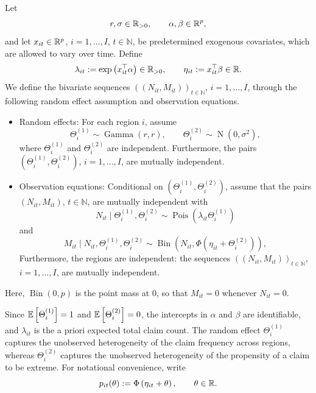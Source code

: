 \begin{model}
\label{model.thin}
Let
\[
r,\sigma\in\mathbb{R}_{>0},
\qquad
\alpha,\beta\in\mathbb{R}^p,
\]
and let \(x_{it}\in\mathbb{R}^p\), \(i=1,\ldots,I\), \(t\in\mathbb N\), be
predetermined exogenous covariates, which are allowed to vary over time.
Define
\[
\lambda_{it}:=\exp\left(x_{it}^\top\alpha\right)\in\mathbb{R}_{>0},
\qquad
\eta_{it}:=x_{it}^\top\beta\in\mathbb{R}.
\]
We define the bivariate sequences
\(\left((N_{it},M_{it})\right)_{t\in\mathbb N}\), \(i=1,\ldots,I\),
through the following random effect assumption and observation
equations.
\begin{itemize}
  \item[i.] Random effects: For each region \(i\), assume
  \[
  \Theta_i^{(1)}\sim\operatorname{Gamma}(r,r),
  \qquad
  \Theta_i^{(2)}\sim\operatorname{N}(0,\sigma^2),
  \]
  where \(\Theta_i^{(1)}\) and \(\Theta_i^{(2)}\) are independent.
  Furthermore, the pairs
  \(\left(\Theta_i^{(1)},\Theta_i^{(2)}\right)\), \(i=1,\ldots,I\),
  are mutually independent.

  \item[ii.] Observation equations: Conditional on
  \(\left(\Theta_i^{(1)},\Theta_i^{(2)}\right)\), assume that the pairs
  \((N_{it},M_{it})\), \(t\in\mathbb N\), are mutually independent with
  \[
  N_{it}\mid\Theta_i^{(1)},\Theta_i^{(2)}
  \sim
  \operatorname{Pois}\left(\lambda_{it}\Theta_i^{(1)}\right)
  \]
  and
  \[
  M_{it}\mid N_{it},\Theta_i^{(1)},\Theta_i^{(2)}
  \sim
  \operatorname{Bin}\left(N_{it},\Phi\left(\eta_{it}+\Theta_i^{(2)}\right)\right),
  \]
  Furthermore, the regions are independent: the sequences
  \(\left((N_{it},M_{it})\right)_{t\in\mathbb N}\), \(i=1,\ldots,I\),
  are mutually independent.
\end{itemize}
\end{model}
Here, \(\operatorname{Bin}(0,p)\) is the point mass at \(0\), so that
\(M_{it}=0\) whenever \(N_{it}=0\).

Since \({\mathbb E}\left[\Theta_i^{(1)}\right]=1\) and \({\mathbb E}\left[\Theta_i^{(2)}\right]=0\), the
intercepts in \(\alpha\) and \(\beta\) are identifiable, and
\(\lambda_{it}\) is the a priori expected total claim count. The random
effect \(\Theta_i^{(1)}\) captures the unobserved heterogeneity of the
claim frequency across regions, whereas \(\Theta_i^{(2)}\) captures the
unobserved heterogeneity of the propensity of a claim to be extreme.
For notational convenience, write
\[
p_{it}(\theta):=\Phi\left(\eta_{it}+\theta\right),
\qquad \theta\in\mathbb{R}.
\]

